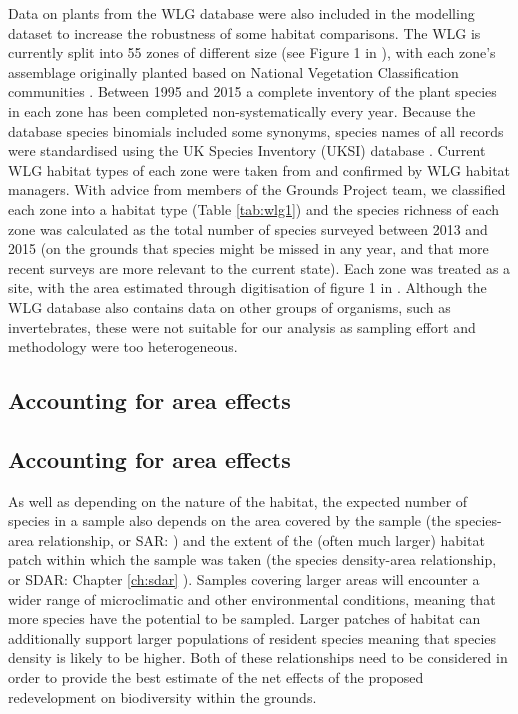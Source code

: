 Data on plants from the WLG database were also included in the modelling dataset to increase the robustness of some habitat comparisons. The WLG is currently split into 55 zones of different size (see Figure 1 in \citealt{Leigh:2003ln}), with each zone's assemblage originally planted based on National Vegetation Classification communities \citep{Honey:1999ln,Rodwell:1998nvc}. Between 1995 and 2015 a complete inventory of the plant species in each zone has been completed non-systematically every year. Because the database species binomials included some synonyms, species names of all records were standardised using the UK Species Inventory (UKSI) database \citep{Raper:2014wg}. Current WLG habitat types of each zone were taken from \citep{Leigh:2003ln} and confirmed by WLG habitat managers. With advice from members of the Grounds Project team, we classified each zone into a habitat type (Table \ref{tab:wlg1}) and the species richness of each zone was calculated as the total number of species surveyed between 2013 and 2015 (on the grounds that species might be missed in any year, and that more recent surveys are more relevant to the current state). Each zone was treated as a site, with the area estimated through digitisation of figure 1 in \cite{Leigh:2003ln}. Although the WLG database also contains data on other groups of organisms, such as invertebrates, these were not suitable for our analysis as sampling effort and methodology were too heterogeneous.

\ifappendixStyle %
\subsection{Accounting for area effects}%
\else
\subsection*{Accounting for area effects}
\fi
As well as depending on the nature of the habitat, the expected number of species in a sample also depends on the area covered by the sample (the species-area relationship, or SAR: \citealt{rosenzweig:1995species}) and the extent of the (often much larger) habitat patch within which the sample was taken (the species density-area relationship, or SDAR: 
\ifappendixStyle %
Chapter \ref{ch:sdar}%
\else
\citealt{Phillips:2015sdar}
\fi
). Samples covering larger areas will encounter a wider range of microclimatic and other environmental conditions, meaning that more species have the potential to be sampled. Larger patches of habitat can additionally support larger populations of resident species meaning that species density is likely to be higher. Both of these relationships need to be considered in order to provide the best estimate of the net effects of the proposed redevelopment on biodiversity within the grounds.

